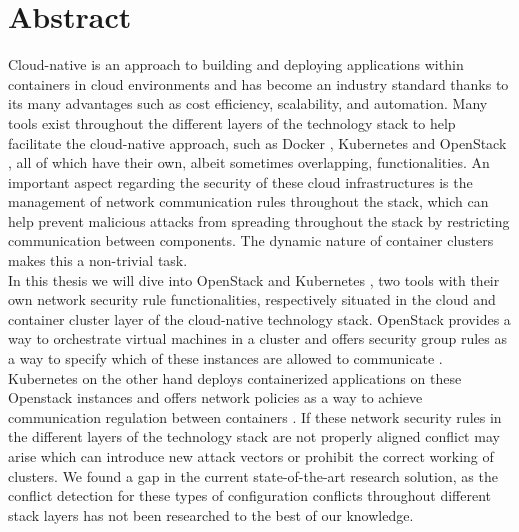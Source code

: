 \chapter{Abstract} \label{ch:abstract}
Cloud-native is an approach to building and deploying applications within containers in cloud environments and has become an industry standard thanks to its many advantages such as cost efficiency, scalability, and automation. Many tools exist throughout the different layers of the technology stack to help facilitate the cloud-native approach, such as Docker \cite{docker}, Kubernetes \cite{Bernstein2014} and OpenStack \cite{Openstack}, all of which have their own, albeit sometimes overlapping, functionalities. An important aspect regarding the security of these cloud infrastructures is the management of network communication rules throughout the stack, which can help prevent malicious attacks from spreading throughout the stack by restricting communication between components. The dynamic nature of container clusters makes this a non-trivial task.
\\[10pt]

In this thesis we will dive into OpenStack \cite{Openstack} and Kubernetes \cite{Bernstein2014}, two tools with their own network security rule functionalities, respectively situated in the cloud and container cluster layer of the cloud-native technology stack. OpenStack provides a way to orchestrate virtual machines in a cluster and offers security group rules as a way to specify which of these instances are allowed to communicate  \cite{sgrule}. Kubernetes on the other hand deploys containerized applications on these Openstack instances and offers network policies as a way to achieve communication regulation between containers \cite{nps}. If these network security rules in the different layers of the technology stack are not properly aligned conflict may arise which can introduce new attack vectors or prohibit the correct working of clusters. We found a gap in the current state-of-the-art research solution, as the conflict detection for these types of configuration conflicts throughout different stack layers has not been researched to the best of our knowledge.
\\[10pt]

